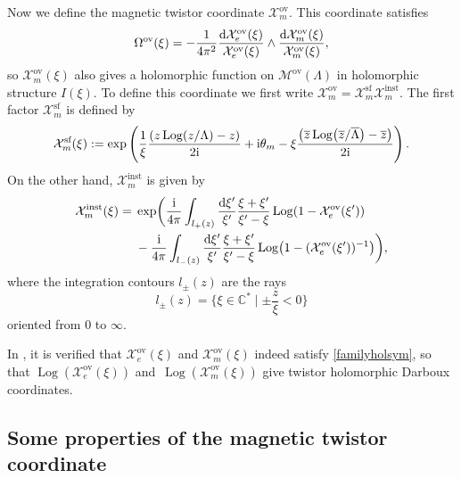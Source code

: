Now we define the magnetic twistor coordinate $\mathcal{X}_m^\text{ov}$. This coordinate satisfies
\begin{equation}\label{familyholsym}
 \Omega^{\text{ov}}(\xi)=-\frac{1}{4\pi^2}\frac{{\rm d}\mathcal{X}_e^\text{ov}(\xi)}{\mathcal{X}_e^\text{ov}(\xi)}\wedge \frac{{\rm d}\mathcal{X}_m^\text{ov}(\xi)}{\mathcal{X}_m^\text{ov}(\xi)},
\end{equation}
so $\mathcal{X}_m^\text{ov}(\xi)$ also gives a holomorphic function on $\mathcal{M}^{\text{ov}}(\Lambda)$ in holomorphic structure $I(\xi)$. To define this coordinate we first write $\mathcal{X}_m^\text{ov}=\mathcal{X}_m^{\text{sf}}\mathcal{X}_m^{\text{inst}}$. The first factor $\mathcal{X}_m^{\text{sf}}$ is defined by
\begin{equation}\label{Xmsf}
 \mathcal{X}_m^{\text{sf}}(\xi):=\exp \left(\frac{1}{\xi}\frac{(z\operatorname{Log}(z/\Lambda)-z)}{2 {\rm i}}+{\rm i}\theta_m -\xi\frac{\bigl(\overline{z} \operatorname{Log}\bigl(\overline{z}/\overline{\Lambda}\bigr)-\overline{z}\bigr)}{2 {\rm i}}\right).
\end{equation}
On the other hand, $\mathcal{X}_m^{\text{inst}}$ is given by
\begin{align}
 \mathcal{X}_m^{\text{inst}}(\xi)={}&\exp \biggl(\frac{{\rm i}}{4\pi}\int_{l_{+}(z)}\frac{{\rm d}\xi'}{\xi'}\frac{\xi+\xi'}{\xi'-\xi}\operatorname{Log}(1-\mathcal{X}_e^\text{ov}(\xi'))\nonumber\\
 &- \frac{{\rm i}}{4\pi}\int_{l_{-}(z)}\frac{{\rm d}\xi'}{\xi'}\frac{\xi+\xi'}{\xi'-\xi}\operatorname{Log}\bigl(1-(\mathcal{X}_e^\text{ov}(\xi'))^{-1}\bigr)\biggr),\label{Xminst}
\end{align}
where the integration contours $l_{\pm}(z)$ are the rays
\begin{equation}\label{rays}
 l_{\pm}(z)=\biggl\{\xi \in \mathbb{C}^* \mid \pm\frac{z}{\xi}<0\biggr\}
\end{equation}
oriented from $0$ to $\infty$.

In \cite{GMN1}, it is verified that $\mathcal{X}_e^\text{ov}(\xi)$ and $\mathcal{X}_m^\text{ov}(\xi)$ indeed satisfy \eqref{familyholsym}, so that $\operatorname{Log}(\mathcal{X}_e^\text{ov}(\xi))$ and~$\operatorname{Log}(\mathcal{X}_m^\text{ov}(\xi))$ give twistor holomorphic Darboux coordinates.

\subsection{Some properties of the magnetic twistor coordinate}

